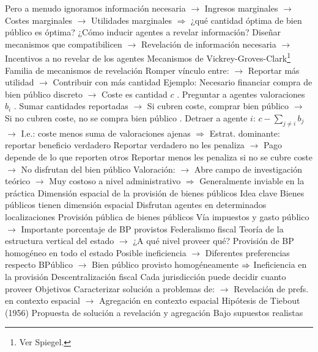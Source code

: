 \documentclass{nuevotema}
\begin{document}
\begin{esquemal}
				\4[] Pero a menudo ignoramos información necesaria
				\4[] $\to$ Ingresos marginales
				\4[] $\to$ Costes marginales
				\4[] $\to$ Utilidades marginales
				\4[] $\Rightarrow$ ¿qué cantidad óptima de bien público es óptima?
				\4 ¿Cómo inducir agentes a revelar información?
				\4[] Diseñar mecanismos que compatibilicen
				\4[] $\to$ Revelación de información necesaria
				\4[] $\to$ Incentivos a no revelar de los agentes
				\4 Mecanismos de Vickrey-Groves-Clark\footnote{Ver Spiegel.}
				\4[] Familia de mecanismos de revelación
				\4[] Romper vínculo entre:
				\4[] $\to$ Reportar más utilidad
				\4[] $\to$ Contribuir con más cantidad
				\4[] Ejemplo:
				\4[] Necesario financiar compra de bien público discreto
				\4[] $\to$ Coste es cantidad $c$
				. Preguntar a agentes valoraciones $b_i$
				. Sumar cantidades reportadas
				\4[] $\to$ Si cubren coste, comprar bien público
				\4[] $\to$ Si no cubren coste, no se compra bien público
				. Detraer a agente $i$: $c - \sum_{j\neq i} b_j$
				\4[] $\to$ I.e.: coste menos suma de valoraciones ajenas
				\4[] $\Rightarrow$ Estrat. dominante: reportar beneficio verdadero
				\4[] Reportar verdadero no les penaliza
				\4[] $\to$ Pago depende de lo que reporten otros
				\4[] Reportar menos les penaliza si no se cubre coste
				\4[] $\to$ No disfrutan del bien público
				\4[] Valoración:
				\4[] $\to$ Abre campo de investigación teórico
				\4[] $\to$ Muy costoso a nivel administrativo
				\4[] $\Rightarrow$ Generalmente inviable en la práctica
		\2 Dimensión espacial de la provisión de bienes públicos
			\3 Idea clave
				\4 Bienes públicos tienen dimensión espacial
				\4[] Disfrutan agentes en determinados localizaciones
				\4 Provisión pública de bienes públicos
				\4[] Vía impuestos y gasto público
				\4[] $\to$ Importante porcentaje de BP provistos
				\4 Federalismo fiscal
				\4[] Teoría de la estructura vertical del estado
				\4[] $\to$ ¿A qué nivel proveer qué?
				\4 Provisión de BP homogéneo en todo el estado
				\4[] Posible ineficiencia
				\4[] $\to$ Diferentes preferencias respecto BPúblico
				\4[] $\to$ Bien público provisto homogéneamente
				\4[] $\Rightarrow$ Ineficiencia en la provisión
				\4 Descentralización fiscal
				\4[] Cada jurisdicción puede decidir cuanto proveer
				\4 Objetivos
				\4[] Caracterizar solución a problemas de:
				\4[] $\to$ Revelación de prefs. en contexto espacial
				\4[] $\to$ Agregación en contexto espacial
			\3 Hipótesis de Tiebout (1956)
				\4 Propuesta de solución a revelación y agregación
				\4 Bajo supuestos realistas

\end{esquemal}
\end{document}
